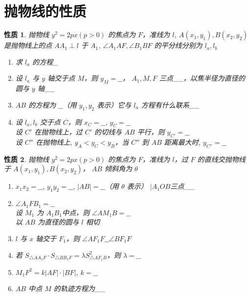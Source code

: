 \documentclass[a4paper,10pt,twoside]{article}
\newtheorem{proposition}{性质}
\begin{document}
\section{抛物线的性质}
\begin{proposition}
    抛物线 $ y^2=2px(p>0) $ 的焦点为 $ F  $，准线为 $ l  $,  $ A(x_1,y_1),B(x_2,y_2) $ 是抛物线上的点 $ AA_1\perp l  $ 于 $ A_1 $, $ \angle A_1AF,\angle B_1BF $ 的平分线分别为 $ l_a,l_b $
    \begin{enumerate}[ $ (1) $ ]
        \item 求 $ l_a $ 的方程\_
        \item 设 $ l_a  $ 与 $ y  $ 轴交于点 $ M  $，则 $ y_M =\_\_  $， $ A_1,M,F  $ 三点\_\_，以焦半径为直径的圆与 $ y  $ 轴\_\_
        \item  $ AB  $ 的方程为 $ \_\_  $（用 $ y_1,y_2 $ 表示）它与 $ l_a  $ 方程有什么联系\_\_
        \item 设 $ l_a,l_b  $ 交于点 $ C  $，则 $ x_C=\_\_,\,y_C=\_\_  $\\设 $ C' $ 在抛物线上，过 $ C'  $ 的切线与 $ AB  $ 平行，则 $ y_{C'}=\_\_ $\\设 $ C''  $ 在抛物线上, $ y_A<y_C<y_B  $，当 $ C'' $ 到 $ AB  $ 距离最大时, $ y_{C''}=\_\_ $  
    \end{enumerate}     
\end{proposition}
\begin{proposition}
    抛物线 $ y^2=2px(p>0) $ 的焦点为 $ F  $，准线为 $ l  $，过 $ F  $ 的直线交抛物线于 $ A(x_1,y_1),B(x_2,y_2) $， $ AB $ 倾斜角为 $ \theta  $ 
    \begin{enumerate}[ $ (1) $ ]
        \item  $ x_1x_2=\_\_,\,y_1y_2=\_\_,\,|AB|=\_\_ $（用 $ \theta  $ 表示） $ | A_1OB $三点\_\_
        \item  $ \angle A_1FB_1=\_\_ $\\设 $ M_1  $ 为 $ A_1B_1 $中点，则 $ \angle AM_1B =\_\_$\\以 $ AB  $ 为直径的圆与 $ l  $ 相切
        \item  $ l  $ 与 $ x  $ 轴交于 $ F_1  $，则 $ \angle AF_1F\_\_\angle BF_1F $
        \item 若 $ S_{\triangle AA_1F}\cdot S_{\triangle BB_1F}=\lambda S_{\triangle AF_1B}^2 $，则 $ \lambda=\_\_ $
        \item  $ M_1F^2=k|AF|\cdot|BF| $, $ k=\_\_ $
        \item  $ AB  $ 中点 $ M  $ 的轨迹方程为\_\_          
    \end{enumerate} 
\end{proposition}
\end{document}
